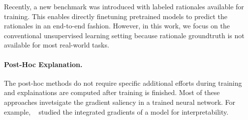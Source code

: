 \documentclass[letterpaper]{article} %
\begin{document}
Recently, a new benchmark \cite{deyoung2019eraser} was introduced with labeled rationales available for training. This enables directly finetuning pretrained models \cite{DBLP:journals/corr/abs-1802-05365,Radford2018ImprovingLU,Devlin2019BERTPO,Yang2019XLNetGA} to predict the rationales in an end-to-end fashion. However, in this work, we focus on the conventional unsupervised learning setting because rationale groundtruth is not available for most real-world tasks.




\paragraph{Post-Hoc Explanation.}
The post-hoc methods do not require specific additional efforts during training and explainations are computed after training is finished. Most of these approaches invetsigate the gradient saliency in a trained neural network. For example, ~\citet{sundararajan2017axiomatic,smilkov2017smoothgrad,Bao2018DerivingMA} studied the integrated gradients of a model for interpretability.
\end{document}
